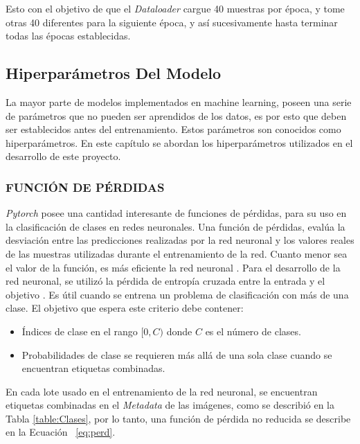 Esto con el objetivo de que el \textit{Dataloader} cargue 40 muestras por época, y tome otras 40 diferentes para la siguiente época, y así sucesivamente hasta terminar todas las épocas establecidas.  





\subsection{Hiperparámetros Del Modelo}

La mayor parte de modelos implementados en machine learning, poseen una serie de parámetros que no pueden ser aprendidos de los datos, es por esto que deben ser establecidos antes del entrenamiento. Estos parámetros son conocidos como hiperparámetros. En este capítulo se abordan los hiperparámetros utilizados en el desarrollo de este proyecto.

\subsubsection{FUNCIÓN DE PÉRDIDAS}		

\textit{Pytorch} posee una cantidad interesante de funciones de pérdidas, para su uso en la clasificación de clases en redes neuronales. Una función de pérdidas, evalúa la desviación entre las predicciones realizadas por la red neuronal y los valores reales de las muestras utilizadas durante el entrenamiento de la red. Cuanto menor sea el valor de la función, es más eficiente la red neuronal \cite{mathivet2018inteligencia}. 	
Para el desarrollo de la red neuronal, se utilizó la pérdida de entropía cruzada entre la entrada y el objetivo \cite{Pytorch}. Es útil cuando se entrena un problema de clasificación con más de una clase.  El objetivo que espera este criterio debe contener:

\begin{itemize}
	\item Índices de clase en el rango $[0,C)$ donde $C$ es el número de clases.
	\item Probabilidades de clase se requieren más allá de una sola clase cuando se encuentran etiquetas combinadas.				 
\end{itemize}

En cada lote usado en el entrenamiento de la red neuronal, se encuentran etiquetas combinadas en el \textit{Metadata} de las imágenes, como se describió en la Tabla \ref{table:Clases}, por lo tanto, una función de pérdida no reducida \cite{Pytorch} se describe en la Ecuación ~\ref{eq:perd}.\\

